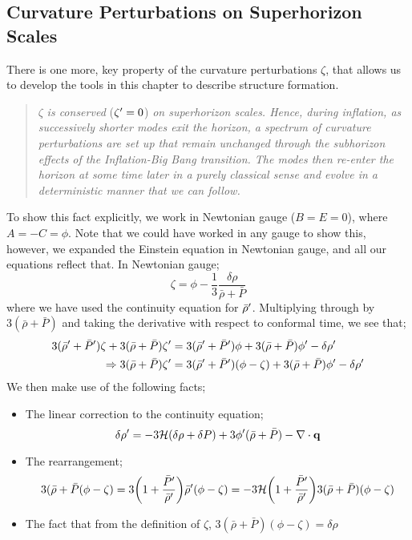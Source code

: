 \subsection{Curvature Perturbations on Superhorizon Scales}
There is one more, key property of the curvature perturbations $\zeta$, that allows us to develop the tools in this chapter to describe structure formation. 
\begin{quote}
$\zeta$ \emph{is conserved} ($\zeta^{\prime} = 0$) \emph{on superhorizon scales. Hence, during inflation, as successively shorter modes exit the horizon, a spectrum of curvature perturbations are set up that remain unchanged through the subhorizon effects of the Inflation-Big Bang transition. The modes then re-enter the horizon at some time later in a purely classical sense and evolve in a deterministic manner that we can follow.} 
\end{quote}
To show this fact explicitly, we work in Newtonian gauge ($B = E = 0$), where $A = -C = \phi$. Note that we could have worked in any gauge to show this, however, we expanded the Einstein equation in Newtonian gauge, and all our equations reflect that. In Newtonian gauge;
\begin{equation*}
\zeta = \phi - \frac{1}{3}\frac{\delta \rho}{\bar{\rho} + \bar{P}}
\end{equation*}
where we have used the continuity equation for $\bar{\rho}^{\prime}$. Multiplying through by $3(\bar{\rho} + \bar{P})$ and taking the derivative with respect to conformal time, we see that;
\begin{align*}
3(\bar{\rho}^{\prime} + \bar{P}^{\prime})\zeta + 3(\bar{\rho} + \bar{P})\zeta^{\prime} &= 3(\bar{\rho}^{\prime} + \bar{P}^{\prime})\phi + 3(\bar{\rho} + \bar{P})\phi^{\prime} - \delta \rho^{\prime} \\
\Rightarrow 3(\bar{\rho} + \bar{P})\zeta^{\prime} &= 3(\bar{\rho}^{\prime} + \bar{P}^{\prime})(\phi - \zeta) + 3(\bar{\rho} + \bar{P})\phi^{\prime} - \delta \rho^{\prime}
\end{align*}
We then make use of the following facts;
\begin{itemize}
\item The linear correction to the continuity equation;
\begin{equation*}
\delta \rho^{\prime} = -3\mathcal{H}(\delta \rho + \delta P) + 3\phi^{\prime} (\bar{\rho} + \bar{P}) - \nabla\cdot \mathbf{q}
\end{equation*}
\item The rearrangement;
\begin{equation*}
3(\bar{\rho} + \bar{P}(\phi - \zeta) = 3\left(1 + \frac{\bar{P}\pr}{\bar{\rho}\pr}\right)\bar{\rho}\pr (\phi - \zeta) = -3\hamilt\left(1 + \frac{\bar{P}\pr}{\bar{\rho}\pr}\right)3(\bar{\rho} + \bar{P})(\phi - \zeta)
\end{equation*}
\item The fact that from the definition of $\zeta$, $3(\bar{\rho} + \bar{P})(\phi - \zeta) = \delta \rho$
\end{itemize}
